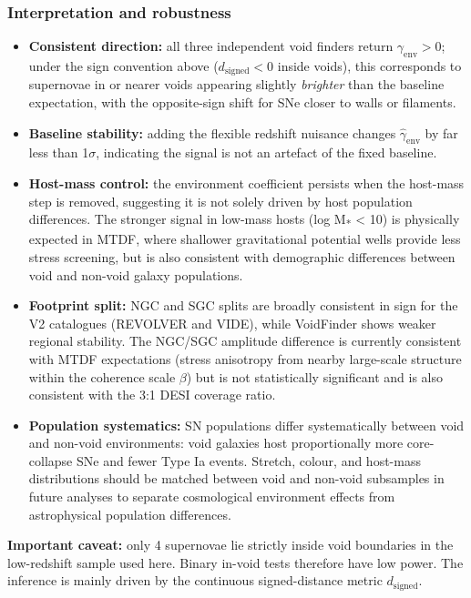 \documentclass[11pt,a4paper]{article}
\begin{document}
\subsubsection{Interpretation and robustness}
\begin{itemize}
  \item \textbf{Consistent direction:} all three independent void finders return \(\gamma_{\mathrm{env}} > 0\); under the sign convention above (\(d_{\mathrm{signed}} < 0\) inside voids), this corresponds to supernovae in or nearer voids appearing slightly \emph{brighter} than the baseline expectation, with the opposite-sign shift for SNe closer to walls or filaments.
  \item \textbf{Baseline stability:} adding the flexible redshift nuisance changes \(\hat\gamma_{\mathrm{env}}\) by far less than 1\(\sigma\), indicating the signal is not an artefact of the fixed baseline.
  \item \textbf{Host-mass control:} the environment coefficient persists when the host-mass step is removed, suggesting it is not solely driven by host population differences. The stronger signal in low-mass hosts (log M\textsubscript{*} < 10) is physically expected in MTDF, where shallower gravitational potential wells provide less stress screening, but is also consistent with demographic differences between void and non-void galaxy populations.
  \item \textbf{Footprint split:} NGC and SGC splits are broadly consistent in sign for the V2 catalogues (REVOLVER and VIDE), while VoidFinder shows weaker regional stability. The NGC/\allowbreak{}SGC amplitude difference is currently consistent with MTDF expectations (stress anisotropy from nearby large-scale structure within the coherence scale $\beta$) but is not statistically significant and is also consistent with the 3:1 DESI coverage ratio.
  \item \textbf{Population systematics:} SN populations differ systematically between void and non-void environments: void galaxies host proportionally more core-collapse SNe and fewer Type Ia events. Stretch, colour, and host-mass distributions should be matched between void and non-void subsamples in future analyses to separate cosmological environment effects from astrophysical population differences.
\end{itemize}

\begin{mdframed}[linecolor=accent,linewidth=0.5pt,backgroundcolor=callout-bg,leftline=true,rightline=true,topline=true,bottomline=true,innerleftmargin=8pt,innerrightmargin=8pt,innertopmargin=6pt,innerbottommargin=6pt]
\textbf{Important caveat:} only 4 supernovae lie strictly inside void boundaries in the low-redshift sample used here. Binary in-void tests therefore have low power.
The inference is mainly driven by the continuous signed-distance metric \(d_{\mathrm{signed}}\).
\end{mdframed}
\end{document}
